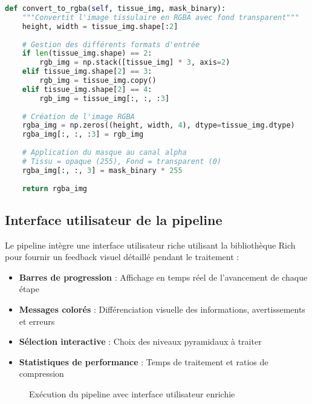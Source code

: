 \documentclass[12pt,a4paper]{report}
\begin{document}
\begin{lstlisting}[language=Python, caption=Extraction RGBA avec gestion de transparence]
def convert_to_rgba(self, tissue_img, mask_binary):
    """Convertit l'image tissulaire en RGBA avec fond transparent"""
    height, width = tissue_img.shape[:2]
    
    # Gestion des différents formats d'entrée
    if len(tissue_img.shape) == 2:
        rgb_img = np.stack([tissue_img] * 3, axis=2)
    elif tissue_img.shape[2] == 3:
        rgb_img = tissue_img.copy()
    elif tissue_img.shape[2] == 4:
        rgb_img = tissue_img[:, :, :3]
    
    # Création de l'image RGBA
    rgba_img = np.zeros((height, width, 4), dtype=tissue_img.dtype)
    rgba_img[:, :, :3] = rgb_img
    
    # Application du masque au canal alpha
    # Tissu = opaque (255), Fond = transparent (0)
    rgba_img[:, :, 3] = mask_binary * 255
    
    return rgba_img
\end{lstlisting}

\subsection{Interface utilisateur de la pipeline}

Le pipeline intègre une interface utilisateur riche utilisant la bibliothèque Rich pour fournir un feedback visuel détaillé pendant le traitement :

\begin{itemize}
\item \textbf{Barres de progression} : Affichage en temps réel de l'avancement de chaque étape
\item \textbf{Messages colorés} : Différenciation visuelle des informations, avertissements et erreurs
\item \textbf{Sélection interactive} : Choix des niveaux pyramidaux à traiter
\item \textbf{Statistiques de performance} : Temps de traitement et ratios de compression
\end{itemize}


\begin{figure}[H]
\centering
{}
\caption{Exécution du pipeline avec interface utilisateur enrichie}
\label{fig:pipeline_execution}
\end{figure}
\end{document}

